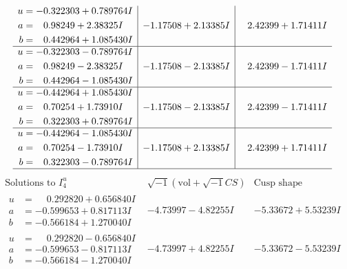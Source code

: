\documentclass[1p]{elsarticle_modified}
\theoremstyle{definition}
\newcommand{\I}{\sqrt{-1}}
\begin{document}
$$\begin{array}{c|c|c}
\begin{aligned}
u &= -0.322303 + 0.789764 I \\
a &= \phantom{-}0.98249 + 2.38325 I \\
b &= \phantom{-}0.442964 + 1.085430 I\end{aligned}
 & -1.17508 + 2.13385 I & \phantom{-}2.42399 + 1.71411 I \\ \hline\begin{aligned}
u &= -0.322303 - 0.789764 I \\
a &= \phantom{-}0.98249 - 2.38325 I \\
b &= \phantom{-}0.442964 - 1.085430 I\end{aligned}
 & -1.17508 - 2.13385 I & \phantom{-}2.42399 - 1.71411 I \\ \hline\begin{aligned}
u &= -0.442964 + 1.085430 I \\
a &= \phantom{-}0.70254 + 1.73910 I \\
b &= \phantom{-}0.322303 + 0.789764 I\end{aligned}
 & -1.17508 - 2.13385 I & \phantom{-}2.42399 - 1.71411 I \\ \hline\begin{aligned}
u &= -0.442964 - 1.085430 I \\
a &= \phantom{-}0.70254 - 1.73910 I \\
b &= \phantom{-}0.322303 - 0.789764 I\end{aligned}
 & -1.17508 + 2.13385 I & \phantom{-}2.42399 + 1.71411 I\\
 \hline 
 \end{array}$$\newpage$$\begin{array}{c|c|c}  
\text{Solutions to }I^u_{4}& \I (\text{vol} + \sqrt{-1}CS) & \text{Cusp shape}\\
 \hline 
\begin{aligned}
u &= \phantom{-}0.292820 + 0.656840 I \\
a &= -0.599653 + 0.817113 I \\
b &= -0.566184 + 1.270040 I\end{aligned}
 & -4.73997 - 4.82255 I & -5.33672 + 5.53239 I \\ \hline\begin{aligned}
u &= \phantom{-}0.292820 - 0.656840 I \\
a &= -0.599653 - 0.817113 I \\
b &= -0.566184 - 1.270040 I\end{aligned}
 & -4.73997 + 4.82255 I & -5.33672 - 5.53239 I \\ \hline\begin{aligned}

\end{aligned}
\end{array}$$
\end{document}
